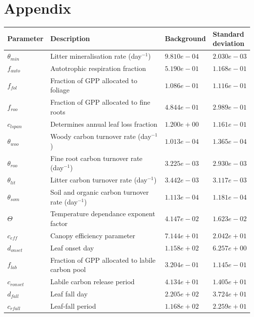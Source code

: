 \documentclass[11pt]{article}
\begin{document}
{}
%

\section*{Appendix}

\begin{table}[ht] 
\begin{center}
	\begin{tabular}{| l | l | l | l |}
	\hline
	Parameter & Description & Background & \pbox{7cm}{Standard \\deviation} \\ \hline
$\theta_{min}$ & Litter mineralisation rate (day$^{-1}$) & $9.810e-04$ & $2.030e-03$ \\ \hline
$f_{auto}$ & Autotrophic respiration fraction & $5.190e-01$ & $1.168e-01$  \\ \hline
$f_{fol}$ & Fraction of GPP allocated to foliage & $1.086e-01$ & $1.116e-01$ \\ \hline
$f_{roo}$ & Fraction of GPP allocated to fine roots & $4.844e-01$ & $2.989e-01$ \\ \hline
$c_{lspan}$ & Determines annual leaf loss fraction & $1.200e+00$ & $1.161e-01$  \\ \hline
$\theta_{woo}$ & Woody carbon turnover rate (day$^{-1}$) & $1.013e-04$ & $1.365e-04$  \\ \hline
$\theta_{roo}$ & Fine root carbon turnover rate (day$^{-1}$) & $3.225e-03$ & $2.930e-03$ \\ \hline
$\theta_{lit}$ & Litter carbon turnover rate (day$^{-1}$) & $3.442e-03$ & $3.117e-03$ \\ \hline
$\theta_{som}$ & Soil and organic carbon turnover rate (day$^{-1}$) & $1.113e-04$ & $1.181e-04$ \\ \hline
$\Theta$ & Temperature dependance exponent factor & $4.147e-02$ & $1.623e-02$ \\ \hline
$c_{eff}$ & Canopy efficiency parameter & $7.144e+01$ & $2.042e+01$  \\ \hline
$d_{onset}$ & Leaf onset day & $1.158e+02$ & $6.257e+00$ \\ \hline
$f_{lab}$ & Fraction of GPP allocated to labile carbon pool & $3.204e-01$ & $1.145e-01$ \\ \hline
$c_{ronset}$ & Labile carbon release period & $4.134e+01$ & $1.405e+01$ \\ \hline
$d_{fall}$ & Leaf fall day & $2.205e+02$ & $3.724e+01$ \\ \hline
$c_{rfall}$ & Leaf-fall period & $1.168e+02$ & $2.259e+01$  \\ \hline

\end{tabular}
\end{center}
\end{table}
\end{document}
